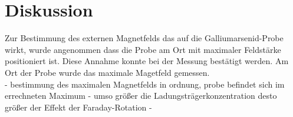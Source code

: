 \section{Diskussion}
\label{sec:Diskussion}
Zur Bestimmung des externen Magnetfelds das auf die Galliumarsenid-Probe wirkt, wurde angenommen dass die Probe am Ort mit maximaler Feldstärke positioniert ist.
Diese Annahme konnte bei der Messung bestätigt werden.
Am Ort der Probe wurde das maximale Magetfeld gemessen.
\\



 - bestimmung des maximalen Magnetfelds in ordnung, probe befindet sich im errechneten Maximum
 - umso größer die Ladungsträgerkonzentration desto größer der Effekt der Faraday-Rotation
 - 